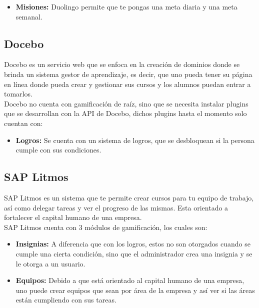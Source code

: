 \begin{multicols*}{2}
\begin{itemize}
    \item {\bf Misiones:} Duolingo permite que te pongas una meta diaria y una meta semanal.

    \end{itemize}


\subsection*{Docebo}
    
 Docebo \cite{PagDocebo} es un servicio web que se enfoca en la creación de dominios donde se brinda
 un sistema gestor de aprendizaje, es decir, que uno pueda tener su página en línea
 donde pueda crear y gestionar sus cursos y los alumnos puedan entrar a tomarlos.\\
    
 \noindent Docebo no cuenta con gamificación de raíz, sino que se necesita instalar
 plugins que se desarrollan con la API de Docebo, dichos plugins hasta el momento 
 solo cuentan con:

    \begin{itemize}
        \item {\bf Logros:} Se cuenta con un sistema de logros,
        que se desbloquean si la persona cumple con sus condiciones.
    \end{itemize}
    
    
    
\subsection*{SAP Litmos}
    
 SAP Litmos \cite{PagSAPLitmos} es un sistema que te permite crear cursos para tu equipo de trabajo,
 así como delegar tareas y ver el progreso de las mismas. Esta orientado a
 fortalecer el capital humano de una empresa.\\
    
    \noindent SAP Litmos cuenta con 3 módulos de gamificación, los cuales son:
    
    \begin{itemize}
        \item {\bf Insignias:} A diferencia que con los logros, estos
        no son otorgados cuando se cumple una cierta condición, sino 
        que el administrador crea una insignia y se le otorga a un usuario.
        
        \item {\bf Equipos: } Debido a que está orientado al capital humano
         de una empresa, uno puede crear equipos que sean por área de la
          empresa y así ver si las áreas están cumpliendo con sus tareas.
          

\end{itemize}
\end{multicols*}
